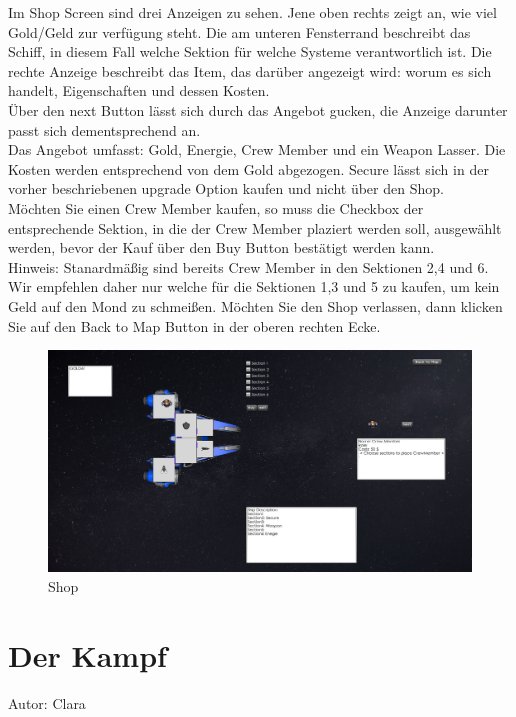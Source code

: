 \documentclass[fontsize=12pt,paper=a4,twoside]{scrartcl}
\begin{document}
Im Shop Screen sind drei Anzeigen zu sehen. Jene oben rechts zeigt an, wie viel Gold/Geld zur verfügung steht. Die am unteren Fensterrand beschreibt das Schiff, in diesem Fall welche Sektion für welche Systeme verantwortlich ist. Die rechte Anzeige beschreibt das Item, das darüber angezeigt wird: worum es sich handelt, Eigenschaften und dessen Kosten.\\
Über den next Button lässt sich durch das Angebot gucken, die Anzeige darunter passt sich dementsprechend an.\\
Das Angebot umfasst: Gold, Energie, Crew Member und ein Weapon Lasser. Die Kosten werden entsprechend von dem Gold abgezogen. Secure lässt sich in der vorher beschriebenen upgrade Option kaufen und nicht über den Shop.\\
Möchten Sie einen Crew Member kaufen, so muss die Checkbox der entsprechende Sektion, in die der Crew Member plaziert werden soll, ausgewählt werden, bevor der Kauf über den Buy Button bestätigt werden kann. \\
Hinweis: Stanardmäßig sind bereits Crew Member in den Sektionen 2,4 und 6. Wir empfehlen daher nur welche für die Sektionen 1,3 und 5 zu kaufen, um kein Geld auf den Mond zu schmeißen.
Möchten Sie den Shop verlassen, dann klicken Sie auf den Back to Map Button in der oberen rechten Ecke.

\begin{figure}[htp]
	\centering
	\includegraphics[width=1.00\linewidth]{pics/shopScreen.png} %
	\caption{Shop}
	\label{fig1}
\end{figure}

\section{Der Kampf}
Autor: Clara\\
\end{document}
